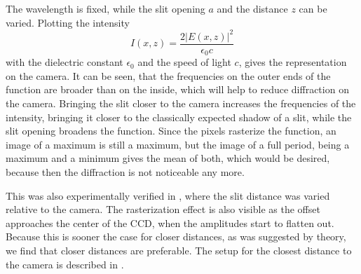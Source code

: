 The wavelength is fixed, while the slit opening $a$ and the distance $z$ can be varied. Plotting the intensity
\begin{equation}
I(x,z) = \frac{2 \lvert E(x,z) \rvert ^2}{\epsilon_0 c}
\end{equation}
with the dielectric constant $\epsilon_0$ and the speed of light $c$, gives the representation on the camera.
It can be seen, that the frequencies on the outer ends of the function are broader than on the inside, which will help to reduce diffraction on the camera. 
Bringing the slit closer to the camera increases the frequencies of the intensity, bringing it closer to the classically expected shadow of a slit, while the slit opening broadens the function.
Since the pixels rasterize the function, an image of a maximum is still a maximum, but the image of a full period, being a maximum and a minimum gives the mean of both, which would be desired, because then the diffraction is not noticeable any more.


This was also experimentally verified in , where the slit distance was varied relative to the camera. The rasterization effect is also visible as the offset approaches the center of the CCD, when the amplitudes start to flatten out. Because this is sooner the case for closer distances, as was suggested by theory, we find that closer distances are preferable. The setup for the closest distance to the camera is described in .
\newpage
